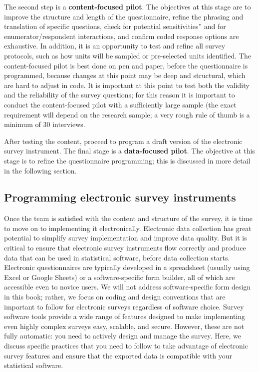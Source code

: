 The second step is a \textbf{content-focused pilot}.
The objectives at this stage are to improve the structure and length of the questionnaire,
refine the phrasing and translation of specific questions,
check for potential sensitivities” and for enumerator/respondent interactions,
and confirm coded response options are exhaustive.
In addition, it is an opportunity to test and refine all survey protocols,
such as how units will be sampled or pre-selected units identified.
The content-focused pilot is best done on pen and paper, before the questionnaire is programmed,
because changes at this point may be deep and structural,
which are hard to adjust in code.
It is important at this point to test both the validity and the reliability 
of the survey questions; 
for this reason it is important to conduct the content-focused pilot
with a sufficiently large sample (the exact requirement will depend on the research sample;
a very rough rule of thumb is a minimum of 30 interviews.

After testing the content, proceed to program a draft version
of the electronic survey instrument.
The final stage is a \textbf{data-focused pilot}.
The objective at this stage is to refine the questionnaire programming;
this is discussed in more detail in the following section.


\subsection{Programming electronic survey instruments}
Once the team is satisfied with the content and structure of the survey,
it is time to move on to implementing it electronically.
Electronic data collection has great potential
to simplify survey implementation and improve data quality.
But it is critical to ensure that electronic survey instruments 
flow correctly and produce data that can be used in statistical software, 
before data collection starts.
Electronic questionnaires are typically developed
in a spreadsheet (usually using Excel or Google Sheets)
or a software-specific form builder,
all of which are accessible even to novice users.
We will not address software-specific form design in this book;
rather, we focus on coding and design conventions that are important to follow
for electronic surveys regardless of software choice.
Survey software tools provide a wide range of features
designed to make implementing even highly complex surveys
easy, scalable, and secure.
However, these are not fully automatic:
you need to actively design and manage the survey.
Here, we discuss specific practices that you need to follow
to take advantage of electronic survey features
and ensure that the exported data
is compatible with your statistical software.


